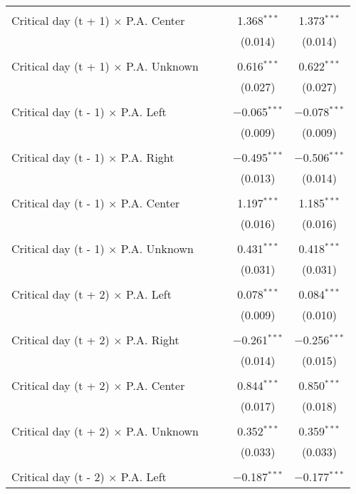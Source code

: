 \documentclass[
]{article}
\begin{document}
\begin{table}[!htbp]
{\begin{tabular}{@{\extracolsep{5pt}}lcccc}
  & & & & \\ 
 Critical day (t + 1) $\times$ P.A. Center &  &  & 1.368$^{***}$ & 1.373$^{***}$ \\ 
  &  &  & (0.014) & (0.014) \\ 
  & & & & \\ 
 Critical day (t + 1) $\times$ P.A. Unknown &  &  & 0.616$^{***}$ & 0.622$^{***}$ \\ 
  &  &  & (0.027) & (0.027) \\ 
  & & & & \\ 
 Critical day (t - 1) $\times$ P.A. Left &  &  & $-$0.065$^{***}$ & $-$0.078$^{***}$ \\ 
  &  &  & (0.009) & (0.009) \\ 
  & & & & \\ 
 Critical day (t - 1) $\times$ P.A. Right &  &  & $-$0.495$^{***}$ & $-$0.506$^{***}$ \\ 
  &  &  & (0.013) & (0.014) \\ 
  & & & & \\ 
 Critical day (t - 1) $\times$ P.A. Center &  &  & 1.197$^{***}$ & 1.185$^{***}$ \\ 
  &  &  & (0.016) & (0.016) \\ 
  & & & & \\ 
 Critical day (t - 1) $\times$ P.A. Unknown &  &  & 0.431$^{***}$ & 0.418$^{***}$ \\ 
  &  &  & (0.031) & (0.031) \\ 
  & & & & \\ 
 Critical day (t + 2) $\times$ P.A. Left &  &  & 0.078$^{***}$ & 0.084$^{***}$ \\ 
  &  &  & (0.009) & (0.010) \\ 
  & & & & \\ 
 Critical day (t + 2) $\times$ P.A. Right &  &  & $-$0.261$^{***}$ & $-$0.256$^{***}$ \\ 
  &  &  & (0.014) & (0.015) \\ 
  & & & & \\ 
 Critical day (t + 2) $\times$ P.A. Center &  &  & 0.844$^{***}$ & 0.850$^{***}$ \\ 
  &  &  & (0.017) & (0.018) \\ 
  & & & & \\ 
 Critical day (t + 2) $\times$ P.A. Unknown &  &  & 0.352$^{***}$ & 0.359$^{***}$ \\ 
  &  &  & (0.033) & (0.033) \\ 
  & & & & \\ 
 Critical day (t - 2) $\times$ P.A. Left &  &  & $-$0.187$^{***}$ & $-$0.177$^{***}$ \\ 

\end{tabular}}
\end{table}
\end{document}
